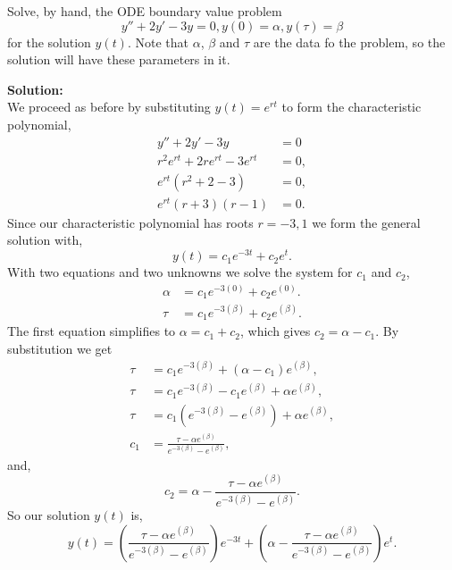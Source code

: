 \documentclass[12pt]{article}
\makeatletter
\theoremstyle{homework}
\newenvironment{exercise}[1]
{\def\@currentlabel{#1}\exercisecore}
{\endexercisecore}
\newcommand{\localhead}[1]{\par\smallskip\noindent\textbf{#1}\nobreak\\}%
\newcommand\solution{\localhead{Solution:}}
\makeatother
\begin{document}
\begin{exercise}{Problem P6} Solve, by hand, the ODE boundary value problem 
  \begin{equation*}
    y'' + 2y' - 3y = 0, y(0) = \alpha, y(\tau) = \beta
  \end{equation*}
  for the solution $y(t)$. Note that $\alpha$, $\beta$ and $\tau$ are the data fo the problem, so the solution will have these parameters in it. 
  \solution We proceed as before by substituting $y(t) = e^{rt}$ to form the characteristic polynomial, 
  \begin{align*}
    y'' + 2y' - 3y &= 0\\
    r^2e^{rt} + 2re^{rt} - 3e^{rt} &= 0,\\
    e^{rt}(r^2 + 2 - 3) &= 0,\\
    e^{rt}(r + 3)(r - 1) &= 0.
  \end{align*}
  Since our characteristic polynomial has roots $r = -3, 1$ we form the general solution with, 
  \begin{equation*}
    y(t) = c_1e^{-3t} + c_2e^{t}.
  \end{equation*}
  With two equations and two unknowns we solve the system for $c_1$ and $c_2$, 
  \begin{align*}
    \alpha &= c_1e^{-3(0)} + c_2e^{(0)}.\\
    \tau &= c_1e^{-3(\beta)} + c_2e^{(\beta)}.
  \end{align*}
  The first equation simplifies to $\alpha = c_1 + c_2$, which gives $c_2 = \alpha - c_1$. By substitution we get 
  \begin{align*}
    \tau &= c_1e^{-3(\beta)} + (\alpha - c_1)e^{(\beta)},\\
    \tau &= c_1e^{-3(\beta)} - c_1e^{(\beta)} + \alpha e^{(\beta)},\\
    \tau &= c_1(e^{-3(\beta)} - e^{(\beta)}) + \alpha e^{(\beta)},\\ 
    c_1 &= \frac{\tau-\alpha e^{(\beta)}}{e^{-3(\beta)} - e^{(\beta)}},
  \end{align*}
and,  
  \begin{equation*}
    c_2 = \alpha - \frac{\tau-\alpha e^{(\beta)}}{e^{-3(\beta)} - e^{(\beta)}}.
  \end{equation*}
  So our solution $y(t)$ is, 
  \begin{equation*}
    y(t) = \left(\frac{\tau-\alpha e^{(\beta)}}{e^{-3(\beta)} - e^{(\beta)}}\right)e^{-3t} + \left(\alpha - \frac{\tau-\alpha e^{(\beta)}}{e^{-3(\beta)} - e^{(\beta)}}\right)e^{t}.
  \end{equation*}

  

\end{exercise}
\vspace{1in}
\end{document}
